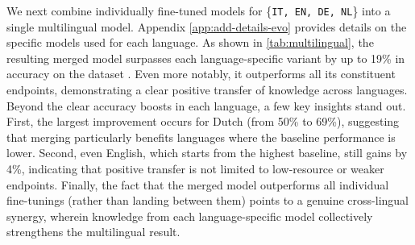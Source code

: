 \begin{table}
      \caption{Evolving a multilingual model. For each language, we report the accuracy on the corresponding translated  of both the language-specific model and the evolved multilingual model.} 
      \label{tab:multilingual}
\end{table}
We next combine individually fine-tuned models for \{\texttt{IT, EN, DE, NL}\} into a single multilingual model. Appendix \ref{app:add-details-evo} provides details on the specific models used for each language. As shown in \cref{tab:multilingual}, the resulting merged model surpasses each language-specific variant by up to 19\% in accuracy on the  dataset \cite{ARC}. Even more notably, it outperforms all its constituent endpoints, demonstrating a clear positive transfer of knowledge across languages.
Beyond the clear accuracy boosts in each language, a few key insights stand out. First, the largest improvement occurs for Dutch (from 50\% to 69\%), suggesting that merging particularly benefits languages where the baseline performance is lower. Second, even English, which starts from the highest baseline, still gains by 4\%, indicating that positive transfer is not limited to low-resource or weaker endpoints. Finally, the fact that the merged model outperforms all individual fine-tunings (rather than landing between them) points to a genuine cross-lingual synergy, wherein knowledge from each language-specific model collectively strengthens the multilingual result.
